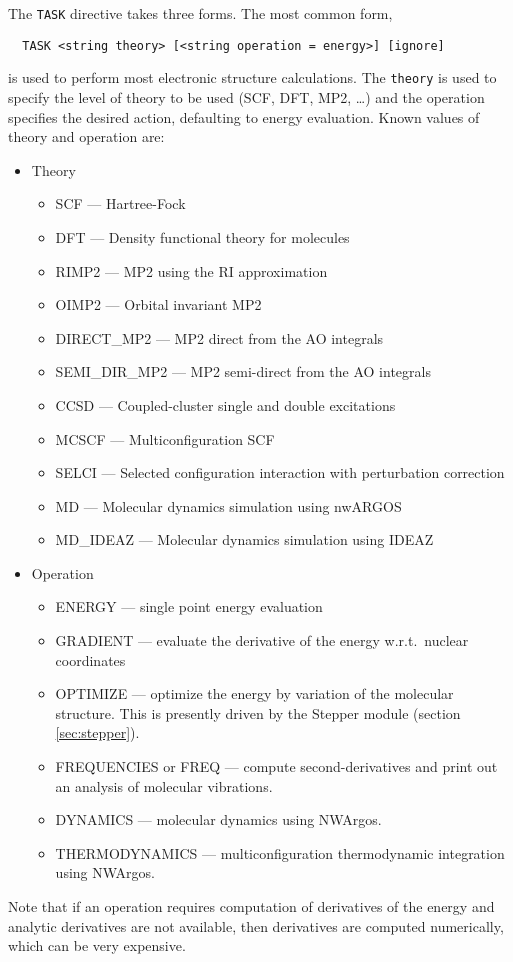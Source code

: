 The \verb+TASK+ directive takes three forms.  The most common form,
\begin{verbatim}
  TASK <string theory> [<string operation = energy>] [ignore]
\end{verbatim}
is used to perform most electronic structure calculations.  The
\verb+theory+ is used to specify the level of theory to be used (SCF,
DFT, MP2, \ldots) and the operation specifies the desired action,
defaulting to energy evaluation.  Known values of theory and operation
are:
\begin{itemize}
\item Theory \newline
\begin{itemize}
 \item SCF --- Hartree-Fock
 \item DFT --- Density functional theory for molecules
 \item RIMP2 --- MP2 using the RI approximation
 \item OIMP2 --- Orbital invariant MP2
 \item DIRECT\_MP2 --- MP2 direct from the AO integrals
 \item SEMI\_DIR\_MP2 --- MP2 semi-direct from the AO integrals
 \item CCSD --- Coupled-cluster single and double excitations
 \item MCSCF --- Multiconfiguration SCF
 \item SELCI --- Selected configuration interaction with perturbation
   correction 
 \item MD --- Molecular dynamics simulation using nwARGOS
 \item MD\_IDEAZ --- Molecular dynamics simulation using IDEAZ
\end{itemize}
\item Operation \newline
\begin{itemize}
 \item ENERGY --- single point energy evaluation
 \item GRADIENT --- evaluate the derivative of the energy w.r.t.\
   nuclear coordinates
 \item OPTIMIZE --- optimize the energy by variation of the molecular
   structure.  This is presently driven by the Stepper module
   (section \ref{sec:stepper}). 
 \item FREQUENCIES or FREQ --- compute second-derivatives and print
   out an analysis of molecular vibrations.
 \item DYNAMICS --- molecular dynamics using NWArgos.
 \item THERMODYNAMICS --- multiconfiguration thermodynamic integration
    using NWArgos.
\end{itemize} 
\end{itemize}
Note that if an operation requires computation of derivatives of the
energy and analytic derivatives are not available, then derivatives
are computed numerically, which can be very expensive.

